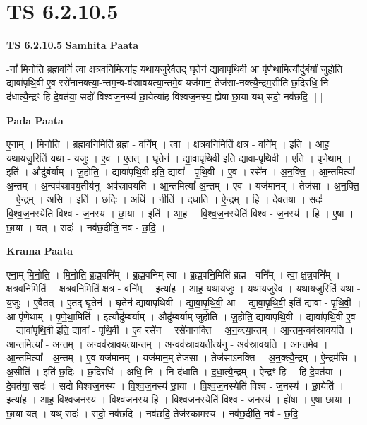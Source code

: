 \documentclass[17pt]{extarticle}
\begin{document}
\section{ TS 6.2.10.5 }

\textbf{TS 6.2.10.5 } \newline
\textbf{Samhita Paata} \newline

-नां᳚ मिनोति ब्रह्म॒वनिं॑ त्वा क्षत्र॒वनि॒मित्या॑ह यथाय॒जुरे॒वैतद् घृ॒तेन॑ द्यावापृथिवी॒ आ पृ॑णेथा॒मित्यौदु॑बंर्यां जुहोति॒ द्यावा॑पृथि॒वी ए॒व रसे॑नानक्त्या॒-न्तम॒न्व-व॑स्रावयत्या॒न्तमे॒व यज॑मानं॒ तेज॑सा-नक्त्यै॒न्द्रम॒सीति॑ छ॒दिरधि॒ नि द॑धात्यै॒न्द्रꣳ हि दे॒वत॑या॒ सदो॑ विश्वज॒नस्य॑ छा॒येत्या॑ह विश्वज॒नस्य॒ ह्ये॑षा छा॒या यथ् सदो॒ नव॑छदि॒- [  ] \newline

\textbf{Pada Paata} \newline

ए॒ना॒म् । मि॒नो॒ति॒ । ब्र॒ह्म॒वनि॒मिति॑ ब्रह्म - वनि᳚म् । त्वा॒ । क्ष॒त्र॒वनि॒मिति॑ क्षत्र - वनि᳚म् । इति॑ । आ॒ह॒ । य॒था॒य॒जु॒रिति॑ यथा - य॒जुः । ए॒व । ए॒तत् । घृ॒तेन॑ । द्या॒वा॒पृ॒थि॒वी॒ इति॑ द्यावा-पृ॒थि॒वी॒ । एति॑ । पृ॒णे॒था॒म् । इति॑ । औदु॑बंर्याम् । जु॒हो॒ति॒ । द्यावा॑पृथि॒वी इति॒ द्यावा᳚ - पृ॒थि॒वी । ए॒व । रसे॑न । अ॒न॒क्ति॒ । आ॒न्तमित्या᳚ - अ॒न्तम् । अ॒न्वव॑स्रावय॒तीय॑नु -अव॑स्रावयति । आ॒न्तमित्या᳚-अ॒न्तम् । ए॒व । यज॑मानम् । तेज॑सा । अ॒न॒क्ति॒ । ऐ॒न्द्रम् । अ॒सि॒ । इति॑ । छ॒दिः । अधि॑ । नीति॑ । द॒धा॒ति॒ । ऐ॒न्द्रम् । हि । दे॒वत॑या । सदः॑ । वि॒श्व॒ज॒नस्येति॑ विश्व - ज॒नस्य॑ । छा॒या । इति॑ । आ॒ह॒ । वि॒श्व॒ज॒नस्येति॑ विश्व - ज॒नस्य॑ । हि । ए॒षा । छा॒या । यत् । सदः॑ । नव॑छ॒दीति॒ नव॑ - छ॒दि॒ ।  \newline


\textbf{Krama Paata} \newline

ए॒ना॒म् मि॒नो॒ति॒ । मि॒नो॒ति॒ ब्र॒ह्म॒वनि᳚म् । ब्र॒ह्म॒वनि॑म् त्वा । ब्र॒ह्म॒वनि॒मिति॑ ब्रह्म - वनि᳚म् । त्वा॒ क्ष॒त्र॒वनि᳚म् । क्ष॒त्र॒वनि॒मिति॑ । क्ष॒त्र॒वनि॒मिति॑ क्षत्र - वनि᳚म् । इत्या॑ह । आ॒ह॒ य॒था॒य॒जुः । य॒था॒य॒जुरे॒व । य॒था॒य॒जुरिति॑ यथा - य॒जुः । ए॒वैतत् । ए॒तद् घृ॒तेन॑ । घृ॒तेन॑ द्यावापृथिवी । द्या॒वा॒पृ॒थि॒वी॒ आ । द्या॒वा॒पृ॒थि॒वी॒ इति॑ द्यावा - पृ॒थि॒वी॒ । आ पृ॑णेथाम् । पृ॒णे॒था॒मिति॑ । इत्यौदु॑म्बर्याम् । औदु॑म्बर्याम् जुहोति । जु॒हो॒ति॒ द्यावा॑पृथि॒वी । द्यावा॑पृथि॒वी ए॒व । द्यावा॑पृथि॒वी इति॒ द्यावा᳚ - पृ॒थि॒वी । ए॒व रसे॑न । रसे॑नानक्ति । अ॒न॒क्त्या॒न्तम् । आ॒न्तम॒न्वव॑स्रावयति । आ॒न्तमित्या᳚ - अ॒न्तम् । अ॒न्वव॑स्रावयत्या॒न्तम् । अ॒न्वव॑स्रावय॒तीत्य॑नु - अव॑स्रावयति । आ॒न्तमे॒व । आ॒न्तमित्या᳚ - अ॒न्तम् । ए॒व यज॑मानम् । यज॑मान॒म् तेज॑सा । तेज॑साऽनक्ति । अ॒न॒क्त्यै॒न्द्रम् । ऐ॒न्द्रम॑सि । अ॒सीति॑ । इति॑ छ॒दिः । छ॒दिरधि॑ । अधि॒ नि । नि द॑धाति । द॒धा॒त्यै॒न्द्रम् । ऐ॒न्द्रꣳ हि । हि दे॒वत॑या । दे॒वत॑या॒ सदः॑ । सदो॑ विश्वज॒नस्य॑ । वि॒श्व॒ज॒नस्य॑ छा॒या । वि॒श्व॒ज॒नस्येति॑ विश्व - ज॒नस्य॑ । छा॒येति॑ । इत्या॑ह । आ॒ह॒ वि॒श्व॒ज॒नस्य॑ । वि॒श्व॒ज॒नस्य॒ हि । वि॒श्व॒ज॒नस्येति॑ विश्व - ज॒नस्य॑ । ह्ये॑षा । ए॒षा छा॒या । छा॒या यत् । यथ् सदः॑ । सदो॒ नव॑छदि । नव॑छदि॒ तेज॑स्कामस्य । नव॑छ॒दीति॒ नव॑ - छ॒दि॒ \newline
\end{document}
